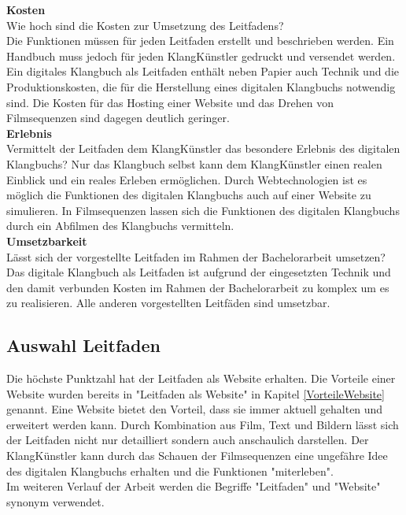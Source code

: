\textbf{Kosten}\\
Wie hoch sind die Kosten zur Umsetzung des Leitfadens?\\
Die Funktionen müssen für jeden Leitfaden erstellt und beschrieben werden. Ein Handbuch muss jedoch für jeden KlangKünstler gedruckt und versendet werden. Ein digitales Klangbuch als Leitfaden enthält neben Papier auch Technik und die Produktionskosten, die für die Herstellung eines digitalen Klangbuchs notwendig sind. Die Kosten für das Hosting einer Website und das Drehen von Filmsequenzen sind dagegen deutlich geringer.\\

\textbf{Erlebnis}\\
Vermittelt der Leitfaden dem KlangKünstler das besondere Erlebnis des digitalen Klangbuchs?
Nur das Klangbuch selbst kann dem KlangKünstler einen realen Einblick und ein reales Erleben ermöglichen. Durch Webtechnologien ist es möglich die Funktionen des digitalen Klangbuchs auch auf einer Website zu simulieren. In Filmsequenzen lassen sich die Funktionen des digitalen Klangbuchs durch ein Abfilmen des Klangbuchs vermitteln.\\

\textbf{Umsetzbarkeit}\\
Lässt sich der vorgestellte Leitfaden im Rahmen der Bachelorarbeit umsetzen?\\
Das digitale Klangbuch als Leitfaden ist aufgrund der eingesetzten Technik und den damit verbunden Kosten im Rahmen der Bachelorarbeit zu komplex um es zu realisieren. Alle anderen vorgestellten Leitfäden sind umsetzbar.\\



\subsection{Auswahl Leitfaden}
Die höchste Punktzahl hat der Leitfaden als Website erhalten. Die Vorteile einer Website wurden bereits in "Leitfaden als Website" in Kapitel \ref{VorteileWebsite} genannt. Eine Website bietet den Vorteil, dass sie immer aktuell gehalten und erweitert werden kann. Durch Kombination aus Film, Text und Bildern lässt sich der Leitfaden nicht nur detailliert sondern auch anschaulich darstellen. Der KlangKünstler kann durch das Schauen der Filmsequenzen eine ungefähre Idee des digitalen Klangbuchs erhalten und die Funktionen "miterleben".\\
Im weiteren Verlauf der Arbeit werden die Begriffe "Leitfaden" und "Website" synonym verwendet.\\



